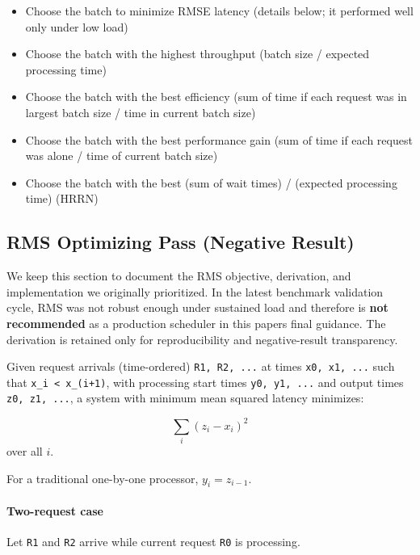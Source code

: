 \documentclass{article}
\providecommand{\tightlist}{\setlength{\itemsep}{0pt}\setlength{\parskip}{0pt}}
\begin{document}
\begin{itemize}
\tightlist
\item
  Choose the batch to minimize RMSE latency (details below; it performed
  well only under low load)
\item
  Choose the batch with the highest throughput (batch size / expected
  processing time)
\item
  Choose the batch with the best efficiency (sum of time if each request
  was in largest batch size / time in current batch size)
\item
  Choose the batch with the best performance gain (sum of time if each
  request was alone / time of current batch size)
\item
  Choose the batch with the best (sum of wait times) / (expected
  processing time) (HRRN)
\end{itemize}

\hypertarget{46-rms-optimizing-pass-negative-result}{%
\subsection{RMS Optimizing Pass (Negative
Result)}\label{46-rms-optimizing-pass-negative-result}}

We keep this section to document the RMS objective, derivation, and
implementation we originally prioritized. In the latest benchmark
validation cycle, RMS was not robust enough under sustained load and
therefore is \textbf{not recommended} as a production scheduler in this
paper\textquotesingle s final guidance. The derivation is retained only
for reproducibility and negative-result transparency.

Given request arrivals (time-ordered) \texttt{R1,\ R2,\ ...} at times
\texttt{x0,\ x1,\ ...} such that \texttt{x\_i\ \textless{}\ x\_(i+1)},
with processing start times \texttt{y0,\ y1,\ ...} and output times
\texttt{z0,\ z1,\ ...}, a system with minimum mean squared latency
minimizes:

\[
\sum_i (z_i - x_i)^2
\]
over all \(i\).

For a traditional one-by-one processor, \(y_i = z_{i-1}\).

\hypertarget{two-request-case}{%
\paragraph{Two-request case}\label{two-request-case}}

Let \texttt{R1} and \texttt{R2} arrive while current request \texttt{R0}
is processing.
\end{document}
